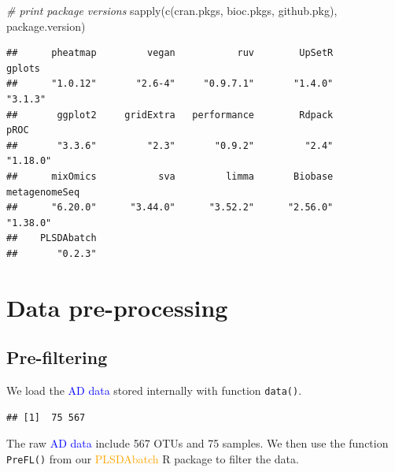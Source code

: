 \documentclass[
]{book}
\newenvironment{Shaded}{\begin{snugshade}}{\end{snugshade}}
\newcommand{\CommentTok}[1]{\textcolor[rgb]{0.56,0.35,0.01}{\textit{#1}}}
\newcommand{\FunctionTok}[1]{\textcolor[rgb]{0.00,0.00,0.00}{#1}}
\newcommand{\NormalTok}[1]{#1}
\newcommand{\OtherTok}[1]{\textcolor[rgb]{0.56,0.35,0.01}{#1}}
\newcommand{\SpecialCharTok}[1]{\textcolor[rgb]{0.00,0.00,0.00}{#1}}
\newcommand{\StringTok}[1]{\textcolor[rgb]{0.31,0.60,0.02}{#1}}
\begin{document}
\begin{Shaded}
\begin{Highlighting}[]
\CommentTok{\# print package versions}
\FunctionTok{sapply}\NormalTok{(}\FunctionTok{c}\NormalTok{(cran.pkgs, bioc.pkgs, github.pkg), package.version)}
\end{Highlighting}
\end{Shaded}

\begin{verbatim}
##      pheatmap         vegan           ruv        UpSetR        gplots 
##      "1.0.12"       "2.6-4"     "0.9.7.1"       "1.4.0"       "3.1.3" 
##       ggplot2     gridExtra   performance        Rdpack          pROC 
##       "3.3.6"         "2.3"       "0.9.2"         "2.4"      "1.18.0" 
##      mixOmics           sva         limma       Biobase metagenomeSeq 
##      "6.20.0"      "3.44.0"      "3.52.2"      "2.56.0"      "1.38.0" 
##    PLSDAbatch 
##       "0.2.3"
\end{verbatim}

\hypertarget{data-pre-processing}{%
\section{Data pre-processing}\label{data-pre-processing}}

\hypertarget{pre-filtering}{%
\subsection{Pre-filtering}\label{pre-filtering}}

We load the \textcolor{blue}{AD data} stored internally with function \texttt{data()}.

\begin{Shaded}
\end{Shaded}

\begin{verbatim}
## [1]  75 567
\end{verbatim}

The raw \textcolor{blue}{AD data} include 567 OTUs and 75 samples. We then use the function \texttt{PreFL()} from our \textcolor{orange}{PLSDAbatch} R package to filter the data.
\end{document}
